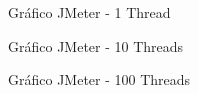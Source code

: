 \documentclass[11pt]{article}
\begin{document}
\begin{figure}[H]
    \centering
    \caption {Gráfico JMeter - 1 Thread}
\end{figure}

\begin{figure}[H]
    \centering
    \caption {Gráfico JMeter - 10 Threads}
\end{figure}

\begin{figure}[H]
    \centering
    \caption {Gráfico JMeter - 100 Threads}
\end{figure}
\end{document}
